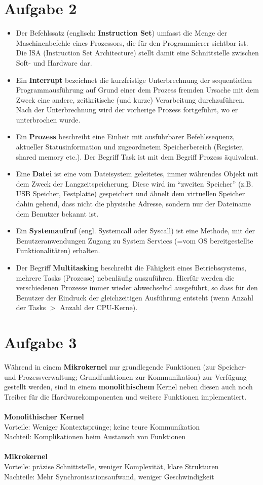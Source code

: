 \documentclass[11pt, a4paper]{scrartcl}
\begin{document}
\section*{Aufgabe 2}
\begin{itemize}
 \item Der Befehlssatz (englisch: \textbf{Instruction Set})
umfasst die Menge der Maschinenbefehle eines Prozessors,
die für den Programmierer sichtbar ist. Die ISA
(Instruction Set Architecture) stellt damit eine Schnittstelle zwischen Soft-
und  Hardware dar. 
\item Ein \textbf{Interrupt} bezeichnet die kurzfristige Unterbrechnung
der sequentiellen Programmausführung auf Grund einer dem Prozess
fremden Ursache mit dem Zweck eine andere, zeitkritische (und kurze) 
Verarbeitung durchzuführen. Nach der Unterbrechnung wird der
vorherige Prozess fortgeführt, wo er unterbrochen wurde. 
\item Ein \textbf{Prozess} beschreibt eine Einheit mit ausführbarer
Befehlssequenz, aktueller Statusinformation und zugeordnetem 
Speicherbereich (Register, shared memory etc.). Der Begriff
Task ist mit dem Begriff Prozess äquivalent.
\item Eine \textbf{Datei} ist eine vom Dateisystem geleitetes, 
immer währendes Objekt mit dem Zweck der Langzeitspeicherung. 
Diese wird im ``zweiten Speicher'' (z.B. USB Speicher, Festplatte)
gespeichert und ähnelt dem virtuellen Speicher dahin gehend,
dass nicht die physische Adresse, sondern nur der Dateiname
dem Benutzer bekannt ist. 
\item Ein \textbf{Systemaufruf} (engl. Systemcall oder Syscall)
ist eine Methode, mit der Benutzeranwendungen Zugang zu System
Services (=vom OS bereitgestellte Funktionalitäten) erhalten.
\item Der Begriff \textbf{Multitasking} beschreibt die Fähigkeit
eines Betriebssystems, mehrere Tasks (Prozesse) nebenläufig auszuführen.
Hierfür werden die verschiedenen Prozesse immer wieder abwechselnd 
ausgeführt, so dass für den Benutzer der Eindruck der gleichzeitigen 
Ausführung entsteht (wenn Anzahl der Tasks $>$ Anzahl der CPU-Kerne).
\end{itemize}
\section*{Aufgabe 3}
Während in einem \textbf{Mikrokernel} nur grundlegende
Funktionen (zur Speicher- und Pro\-zess\-ver\-waltung; 
Grundfunktionen zur Kommunikation) zur Verfügung gestellt
werden, sind in einem \textbf{monolithischem} Kernel 
neben diesen auch noch Treiber für die 
Hardwarekomponenten und weitere Funktionen implementiert.
\\ \\
\textbf{Monolithischer Kernel}\\
Vorteile: Weniger Kontextsprünge; keine teure Kommunikation\\
Nachteil: Komplikationen beim Austausch von Funktionen\\ \\
\textbf{Mikrokernel}\\ 
Vorteile: präzise Schnittstelle, weniger Komplexität, klare 
Strukturen\\
Nachteile: Mehr Synchronisationsaufwand, weniger Geschwindigkeit
\newpage
\end{document}
